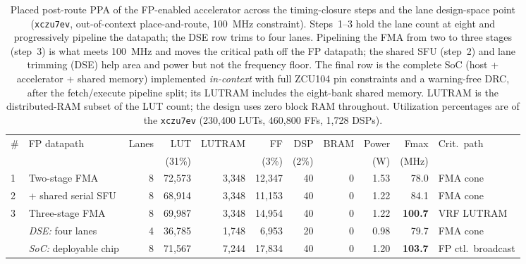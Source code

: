 \documentclass[conference]{IEEEtran}
\begin{document}
\begin{table}[t]
\caption{Placed post-route PPA of the FP-enabled accelerator across the
timing-closure steps and the lane design-space point (\texttt{xczu7ev},
out-of-context place-and-route, 100~MHz constraint). Steps~1--3 hold the lane count
at eight and progressively pipeline the datapath; the DSE row trims to four
lanes. Pipelining the FMA from two to three stages (step~3) is what meets 100~MHz
and moves the critical path off the FP datapath; the shared SFU (step~2) and lane
trimming (DSE) help area and power but not the frequency floor. The final row is
the complete SoC (host + accelerator + shared memory) implemented \emph{in-context}
with full ZCU104 pin constraints and a warning-free DRC, after the fetch/execute
pipeline split; its LUTRAM includes the eight-bank shared memory. LUTRAM is the
distributed-RAM subset of the LUT count; the design uses zero block RAM throughout.
Utilization percentages are of the \texttt{xczu7ev} (230{,}400 LUTs, 460{,}800 FFs,
1{,}728 DSPs).}
\label{tab:fpclose}
\centering
\footnotesize
\begin{tabular}{llrrrrrrrrl}
\toprule
\# & FP datapath & Lanes & LUT & LUTRAM & FF & DSP & BRAM & Power & Fmax & Crit.\ path\\
   &             &       & (31\%) &       & (3\%) & (2\%) & & (W) & (MHz) & \\
\midrule
1 & Two-stage FMA          & 8 & 72{,}573 & 3{,}348 & 12{,}347 & 40 & 0 & 1.53 & 78.0  & FMA cone\\
2 & {}+ shared serial SFU  & 8 & 68{,}914 & 3{,}348 & 11{,}153 & 40 & 0 & 1.22 & 84.1  & FMA cone\\
3 & Three-stage FMA        & 8 & 69{,}987 & 3{,}348 & 14{,}954 & 40 & 0 & 1.22 & \textbf{100.7} & VRF LUTRAM\\
\midrule
  & \emph{DSE:} four lanes & 4 & 36{,}785 & 1{,}748 &  6{,}953 & 20 & 0 & 0.98 & 79.7  & FMA cone\\
\midrule
  & \emph{SoC:} deployable chip & 8 & 71{,}567 & 7{,}244 & 17{,}834 & 40 & 0 & 1.20 & \textbf{103.7} & FP ctl.\ broadcast\\
\bottomrule
\end{tabular}
\end{table}
\end{document}
